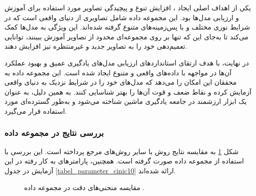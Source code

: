 یکی از اهداف اصلی ایجاد
،
افزایش تنوع و پیچیدگی تصاویر مورد استفاده برای آموزش و ارزیابی مدل‌ها بود. این مجموعه داده شامل تصاویری از دنیای واقعی است که در شرایط نوری مختلف و با پس‌زمینه‌های متنوع گرفته شده‌اند. این ویژگی به مدل‌ها کمک می‌کند تا به‌جای این که تنها بر روی مجموعه‌ای محدود از تصاویر آموزش ببینند، توانایی تعمیم‌دهی خود را به تصاویر جدید و غیرمنتظره نیز افزایش دهند.

در نهایت،
با هدف ارتقای استانداردهای ارزیابی مدل‌های یادگیری عمیق و بهبود عملکرد آن‌ها در مواجهه با داده‌های واقعی و متنوع ایجاد شده است. این مجموعه داده به محققان این امکان را می‌دهد که مدل‌های خود را در شرایط نزدیک به دنیای واقعی آزمایش کرده و نقاط ضعف و قوت آن‌ها را بهتر شناسایی کنند. به همین دلیل،
به عنوان یک ابزار ارزشمند در جامعه یادگیری ماشین شناخته می‌شود و به‌طور گسترده‌ای مورد استفاده قرار می‌گیرد.


\vspace{3mm}
\subsubsection{
	بررسی نتایج در مجموعه داده
}\vspace{-1mm}


شکل
\ref{result_cinic10}
به مقایسه نتایج روش
با سایر روش‌های مرجع پرداخته است. این بررسی با استفاده از مجموعه داده
صورت گرفته است. همچنین، پارامترهای به کار رفته در این آزمایش در جدول
\ref{tabel_parameter_cinic10}
ارائه شده‌اند.

\begin{figure}[b!]
	\centering
	\hspace{0.8mm}
	\caption{
		مقایسه منحنی‌های دقت در مجموعه داده
		.
	}
	\label{result_cinic10}
\end{figure}


